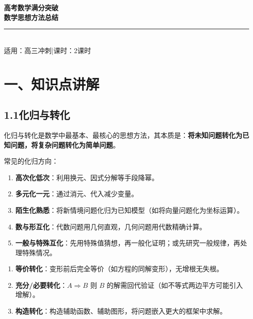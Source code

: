 \documentclass[12pt, a4paper]{ctexart}
\begin{document}
\begin{center}
{\Huge\bfseries\textcolor{mainblue}{高考数学满分突破}}\\[6pt]
{\LARGE\bfseries\textcolor{mainblue}{数学思想方法总结}}\\[12pt]
\rule{0.6\textwidth}{1pt}\\[8pt]
{\normalsize 适用：高三冲刺\quad |\quad 课时：2课时}
\end{center}
\vspace{10pt}

\section*{\textcolor{mainblue}{一、知识点讲解}}

\subsection*{1.1\quad 化归与转化}

\begin{knowledgebox}[化归与转化思想]
化归与转化是数学中最基本、最核心的思想方法，其本质是：\textbf{将未知问题转化为已知问题，将复杂问题转化为简单问题}。

常见的化归方向：
\begin{enumerate}[label=(\arabic*)]
  \item \textbf{高次化低次}：利用换元、因式分解等手段降幂。
  \item \textbf{多元化一元}：通过消元、代入减少变量。
  \item \textbf{陌生化熟悉}：将新情境问题化归为已知模型（如将向量问题化为坐标运算）。
  \item \textbf{数与形互化}：代数问题用几何直观，几何问题用代数精确计算。
  \item \textbf{一般与特殊互化}：先用特殊值猜想，再一般化证明；或先研究一般规律，再处理特殊情况。
\end{enumerate}
\end{knowledgebox}

\begin{tipbox}[化归的三个层次]
\begin{enumerate}[label=\textbf{第\arabic*层}]
  \item \textbf{等价转化}：变形前后完全等价（如方程的同解变形），无增根无失根。
  \item \textbf{充分/必要转化}：$A\Rightarrow B$ 则 $B$ 的解需回代验证（如不等式两边平方可能引入增解）。
  \item \textbf{构造转化}：构造辅助函数、辅助图形，将问题嵌入更大的框架中求解。
\end{enumerate}
\end{tipbox}
\end{document}

